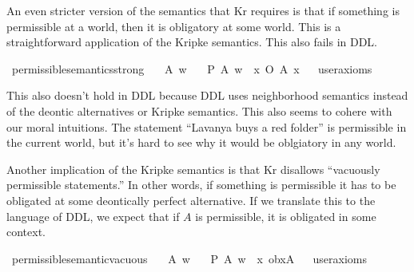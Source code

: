 \begin{isabellebody}
\begin{isamarkuptext}
An even stricter version of the semantics that Kr requires is that if something is permissible at a world, 
then it is obligatory at some world. This is a straightforward application of the Kripke semantics. This
also fails in DDL.%
\end{isamarkuptext}\isamarkuptrue%
\isamarkupfalse%
\ permissible{\isacharunderscore}semantics{\isacharunderscore}strong{\isacharcolon}\isanewline
\ \ \ A\ w\isanewline
\ \ \ {\isachardoublequoteopen}P\ {\isacharbraceleft}A{\isacharbraceright}\ w\ {\isasymlongrightarrow}\ {\isacharparenleft}{\isasymexists}x{\isachardot}\ O\ {\isacharbraceleft}A{\isacharbraceright}\ x{\isacharparenright}{\isachardoublequoteclose}\isanewline
\ \ \isamarkupfalse%
{\isacharbrackleft}user{\isacharunderscore}axioms{\isacharbrackright}%
\isadelimproof
\ %
\endisadelimproof
%
\isatagproof
{}\isamarkupfalse%
\isanewline
%
%
\endisatagproof
{\isafoldproof}%
%
\isadelimproof
%
\endisadelimproof
%
\begin{isamarkuptext}%
This also doesn't hold in DDL because DDL uses neighborhood semantics instead of the deontic 
alternatives or Kripke semantics. This also seems to cohere with our moral intuitions. The statement 
``Lavanya buys a red folder'' is permissible in the current world, but it's hard to see why it would 
be oblgiatory in any world.

Another implication of the Kripke semantics is that Kr disallows ``vacuously permissible statements.'' In 
other words, if something is permissible it has to be obligated at some deontically perfect alternative. 
If we translate this to the language of DDL, we expect that if $A$ is permissible, it is obligated in some 
context.%
\end{isamarkuptext}\isamarkuptrue%
\isamarkupfalse%
\ permissible{\isacharunderscore}semantic{\isacharunderscore}vacuous{\isacharcolon}\isanewline
\ \ \ A\ w\isanewline
\ \ \ {\isachardoublequoteopen}P\ {\isacharbraceleft}A{\isacharbraceright}\ w\ {\isasymlongrightarrow}\ {\isacharparenleft}{\isasymexists}x{\isachardot}\ ob{\isacharparenleft}x{\isacharparenright}{\isacharparenleft}A{\isacharparenright}{\isacharparenright}{\isachardoublequoteclose}\isanewline
\ \ \isamarkupfalse%
{\isacharbrackleft}user{\isacharunderscore}axioms{\isacharbrackright}%
\isadelimproof
\ %
\endisadelimproof
%
\isatagproof
{}\isamarkupfalse%
\isanewline
%
\end{isabellebody}
